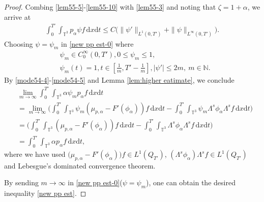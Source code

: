 \documentclass[reqno,a4paper,11pt]{amsart}
\theoremstyle{plain}
\numberwithin{equation}{section}
\renewcommand{\d}{\mathrm{d}}
\newcommand{\dx}{\d x}
\newcommand{\dt}{\d t}
\newcommand{\dtau}{\,\d\tau}
\begin{document}
\begin{proof}
						Combing \eqref{lem55-5}-\eqref{lem55-10} with \eqref{lem55-3} and noting that $\zeta=1+\alpha$, we arrive at
						\begin{align}
							\int_0^{T'}\int_{\mathbb{T}^{3}}p_{\alpha}\psi f\,\dx\dt \leq C\big(\|\psi'\|_{L^{1}(0,T')}+\|\psi\|_{L^{\infty}(0,T')}\big).\label{new pp est-0}
						\end{align}
						Choosing  $\psi=\psi_{m}$ in \eqref{new pp est-0} where
						\begin{equation*}
							\begin{aligned}
								& \psi_{m}\in C_{0}^{\infty}(0,T'),  0\leq\psi_{m}\leq1,
								\\& \psi_{m}(t)=1, t\in\left[\frac{1}{m},T'-\frac{1}{m}\right], |\psi'|\leq 2m,\ m\in \mathbb{N}.
							\end{aligned}
						\end{equation*}
						By \eqref{mode54-4}-\eqref{mode54-5} and Lemma \ref{lem:higher eatimate}, we conclude
						\begin{align}
							\label{eqs:alpha-p-psi-f}
							&\nonumber\lim_{m\to\infty}\int_0^{T'}\int_{\mathbb{T}^{3}}\alpha \psi_{m} p_{\alpha}f\,\dx\dt
							\\&\nonumber=\lim_{m\to\infty}\bigg(\int_0^{T'}\int_{\mathbb{T}^{3}}\psi_{m}(\mu_{p,\alpha}-F'(\phi_{\alpha}))f\,\dx\dt
							-\int_0^{T'}\int_{\mathbb{T}^{3}}\psi_{m}\Lambda^{s}\phi_{\alpha}\Lambda^{s}f\,\dx\dt\bigg)
							\\&\nonumber=\bigg(\int_0^{T'}\int_{\mathbb{T}^{3}}(\mu_{p,\alpha}-F'(\phi_{\alpha}))f\,\dx\dt
							-\int_0^{T'}\int_{\mathbb{T}^{3}}\Lambda^{s}\phi_{\alpha}\Lambda^{s}f\,\dx\dt\bigg)
							\\&=\int_0^{T'}\int_{\mathbb{T}^{3}}\alpha p_{\alpha}f\,\dx\dt,
						\end{align}
						where we have used  $\big(\mu_{p,\alpha}-F'(\phi_{\alpha})\big)f\in L^{1}(Q_{T'})$, $(\Lambda^{s}\phi_{\alpha})\Lambda^{s}f\in L^{1}(Q_{T'})$ and  Lebesgue's dominated convergence theorem.
						
						By sending $m\to\infty$ in \eqref{new pp est-0}($\psi=\psi_{m}$), one can obtain the desired inequality \eqref{new pp est}.
					\end{proof}
					
\end{document}
